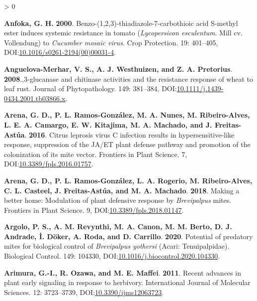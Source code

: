 \documentclass{ufdissertation}[overrideChapters] %
\newlength{\cslhangindent}
\newenvironment{CSLReferences}[2] %
 {%
  \setlength{\parindent}{0pt}
  \ifodd #1 \everypar{\setlength{\hangindent}{\cslhangindent}}\ignorespaces\fi
  \ifnum #2 > 0
  \setlength{\parskip}{#2\baselineskip}
  \fi
 }%
 {}
\begin{document}
{\begin{CSLReferences}{1}{1}
\leavevmode{}%
\textbf{Anfoka, G. H.} \textbf{2000}. Benzo-(1,2,3)-thiadiazole-7-carbothioic acid {S}-methyl ester induces systemic resistance in tomato ({\emph{Lycopersicon esculentum}}. {Mill} cv. {Vollendung}) to {\emph{Cucumber mosaic virus}}. Crop Protection. 19: 401--405, DOI:\href{https://doi.org/10.1016/s0261-2194(00)00031-4}{10.1016/s0261-2194(00)00031-4}.

\leavevmode{}%
\textbf{Anguelova-Merhar, V. S., A. J. Westhuizen, and Z. A. Pretorius}. \textbf{2008}.,3-glucanase and chitinase activities and the resistance response of wheat to leaf rust. Journal of Phytopathology. 149: 381--384, DOI:\href{https://doi.org/10.1111/j.1439-0434.2001.tb03866.x}{10.1111/j.1439-0434.2001.tb03866.x}.

\leavevmode{}%
\textbf{Arena, G. D., P. L. Ramos-González, M. A. Nunes, M. Ribeiro-Alves, L. E. A. Camargo, E. W. Kitajima, M. A. Machado, and J. Freitas-Astúa}. \textbf{2016}. {Citrus leprosis virus} {C} infection results in hypersensitive-like response, suppression of the {JA}/{ET} plant defense pathway and promotion of the colonization of its mite vector. Frontiers in Plant Science. 7, DOI:\href{https://doi.org/10.3389/fpls.2016.01757}{10.3389/fpls.2016.01757}.

\leavevmode{}%
\textbf{Arena, G. D., P. L. Ramos-González, L. A. Rogerio, M. Ribeiro-Alves, C. L. Casteel, J. Freitas-Astúa, and M. A. Machado}. \textbf{2018}. Making a better home: Modulation of plant defensive response by {\emph{Brevipalpus}} mites. Frontiers in Plant Science. 9, DOI:\href{https://doi.org/10.3389/fpls.2018.01147}{10.3389/fpls.2018.01147}.

\leavevmode{}%
\textbf{Argolo, P. S., A. M. Revynthi, M. A. Canon, M. M. Berto, D. J. Andrade, İ. Döker, A. Roda, and D. Carrillo}. \textbf{2020}. Potential of predatory mites for biological control of {\emph{Brevipalpus yothersi}} ({Acari}: {Tenuipalpidae}). Biological Control. 149: 104330, DOI:\href{https://doi.org/10.1016/j.biocontrol.2020.104330}{10.1016/j.biocontrol.2020.104330}.

\leavevmode{}%
\textbf{Arimura, G.-I., R. Ozawa, and M. E. Maffei}. \textbf{2011}. Recent advances in plant early signaling in response to herbivory. International Journal of Molecular Sciences. 12: 3723--3739, DOI:\href{https://doi.org/10.3390/ijms12063723}{10.3390/ijms12063723}.


\end{CSLReferences}}
\end{document}
